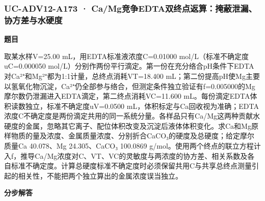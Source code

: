 \documentclass[UTF8,11pt,a4paper]{ctexart}
\begin{document}
\subsubsection*{UC-ADV12-A173 · Ca/Mg竞争EDTA双终点返算：掩蔽泄漏、协方差与水硬度}
\noindent\textbf{题目}\par
取某水样V=25.00 mL，用EDTA标准液浓度C=0.01000 mol/L（标准不确定度uC=0.000050 mol/L）分别作两份平行滴定。第一份在充分络合pH条件下EDTA对Ca²⁺和Mg²⁺都为1:1计量，总终点消耗VT=18.400 mL；第二份提高pH使Mg主要以氢氧化物沉淀，Ca²⁺仍全部参与络合，但测定条件独立验证有f=0.005000的Mg摩尔数仍泄漏进入EDTA滴定，第二终点消耗VC=11.600 mL。每份滴定EDTA体积读数独立，标准不确定度uV=0.0500 mL，体积标定与Ca回收视为准确；EDTA浓度C不确定度是两份滴定共用的同一系统分量。各样品只有Ca/Mg这两种贡献水硬度的金属，忽略其它离子、配位体积改变及沉淀后液体体积变化。求Ca和Mg原样物质的量及浓度、金属质量浓度、分别折合CaCO₃的硬度及总硬度；给定摩尔质量Ca 40.078、Mg 24.305、CaCO₃ 100.0869 g/mol。使用两个终点的联立方程计入f，推导Ca/Mg浓度对C、VT、VC的灵敏度与两浓度的协方差、相关系数及各自标准不确定度。计算总硬度标准不确定度时必须保留共用C与共享总终点测量引起的相关性，不能把两个独立算出的金属浓度误当独立。\par
\medskip\noindent\textbf{分步解答}
\end{document}
